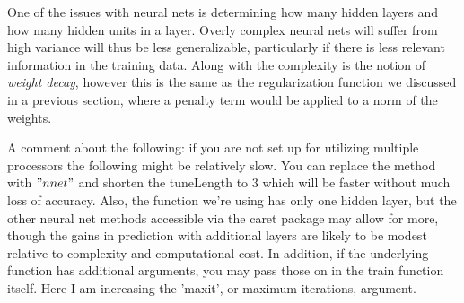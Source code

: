 \documentclass[english,nohyper,titlepage]{tufte-handout}\usepackage{knitr}
\begin{document}
One of the issues with neural nets is determining how many hidden layers and how many hidden units in a layer.  Overly complex neural nets will suffer from high variance will thus be less generalizable, particularly if there is less relevant information in the training data.  Along with the complexity is the notion of \emph{weight decay}, however this is the same as the regularization function we discussed in a previous section, where a penalty term would be applied to a norm of the weights.

A comment about the following: if you are not set up for utilizing multiple processors the following might be relatively slow.  You can replace the method with $"nnet"$ and shorten the tuneLength to 3 which will be faster without much loss of accuracy.  Also, the function we're using has only one hidden layer, but the other neural net methods accessible via the caret package may allow for more, though the gains in prediction with additional layers are likely to be modest relative to complexity and computational cost. In addition, if the underlying function has additional arguments, you may pass those on in the train function itself.  Here I am increasing the 'maxit', or maximum iterations, argument.
\end{document}
